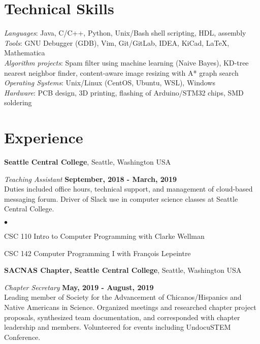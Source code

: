 \documentclass[margin,line]{res}
\newenvironment{list2}{
  \begin{list}{$\bullet$}{%
      \setlength{\itemsep}{0in}
      \setlength{\parsep}{0in} \setlength{\parskip}{0in}
      \setlength{\topsep}{0in} \setlength{\partopsep}{0in} 
      \setlength{\leftmargin}{0.2in}}}{\end{list}}
\begin{document}
\begin{resume}
\section{\sc Technical Skills} 
	{\em Languages}:  
	Java, C/C++, Python, Unix/Bash shell scripting, HDL, assembly
	\\
	{\em Tools}:  
	GNU Debugger (GDB), Vim, Git/GitLab, IDEA, KiCad, \LaTeX, Mathematica 
	\\
	{\em Algorithm projects}: 
	Spam filter using machine learning (Naive Bayes), KD-tree
	nearest neighbor finder, content-aware image resizing with A* graph search
	\\
	{\em Operating Systems}:  
	Unix/Linux (CentOS, Ubuntu, WSL), Windows
	\\
	{\em Hardware}:  PCB design, 3D printing, flashing of Arduino/STM32 chips, SMD soldering
	\\


\vspace{-.3cm}
\section{\sc Experience}


{\bf Seattle Central College}, Seattle, Washington USA

\vspace{-.3cm}
{\em Teaching Assistant} \hfill {\bf September, 2018  - March, 2019}\\
Duties included office hours, technical support, and management of cloud-based messaging forum. 
  Driver of Slack use in computer science classes at Seattle Central College.
\begin{list2}
\item CSC 110 Intro to Computer Programming with Clarke Wellman
\item CSC 142 Computer Programming I with François Lepeintre
\end{list2}     

{\bf SACNAS Chapter, Seattle Central College}, Seattle, Washington USA

\vspace{-.3cm}
{\em Chapter Secretary} \hfill {\bf May, 2019 - August, 2019}\\
Leading member of Society for the Advancement of Chicanos/Hispanics and Native Americans in Science.
  Organized meetings and researched chapter project proposals, synthesized team documentation, and 
  corresponded with chapter leadership and members. Volunteered for events including UndocuSTEM Conference.

\end{resume}
\end{document}

